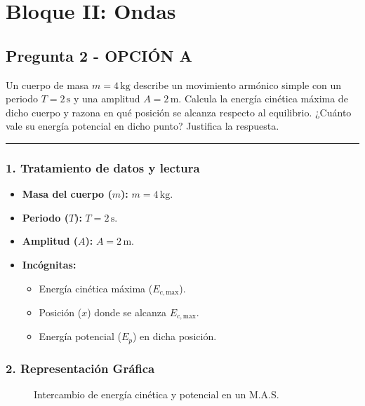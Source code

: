 \section{Bloque II: Ondas}
\label{sec:ondas_2016_jul_ext}
\subsection{Pregunta 2 - OPCIÓN A}
\label{subsec:2A_2016_jul_ext}
\begin{cajaenunciado}
Un cuerpo de masa $m=4\,\text{kg}$ describe un movimiento armónico simple con un periodo $T=2\,\text{s}$ y una amplitud $A = 2\,\text{m}$. Calcula la energía cinética máxima de dicho cuerpo y razona en qué posición se alcanza respecto al equilibrio. ¿Cuánto vale su energía potencial en dicho punto? Justifica la respuesta.
\end{cajaenunciado}
\hrule

\subsubsection*{1. Tratamiento de datos y lectura}
\begin{itemize}
    \item \textbf{Masa del cuerpo ($m$):} $m = 4\,\text{kg}$.
    \item \textbf{Periodo ($T$):} $T = 2\,\text{s}$.
    \item \textbf{Amplitud ($A$):} $A = 2\,\text{m}$.
    \item \textbf{Incógnitas:}
        \begin{itemize}
            \item Energía cinética máxima ($E_{c, \text{max}}$).
            \item Posición ($x$) donde se alcanza $E_{c, \text{max}}$.
            \item Energía potencial ($E_p$) en dicha posición.
        \end{itemize}
\end{itemize}

\subsubsection*{2. Representación Gráfica}
\begin{figure}[H]
    \centering
    \caption{Intercambio de energía cinética y potencial en un M.A.S.}
\end{figure}

